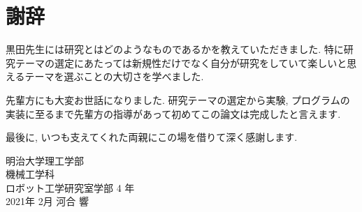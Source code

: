 \chapter*{謝辞}
黒田先生には研究とはどのようなものであるかを教えていただきました. 特に研究テーマの選定にあたっては新規性だけでなく自分が研究をしていて楽しいと思えるテーマを選ぶことの大切さを学べました. \par 先輩方にも大変お世話になりました. 研究テーマの選定から実験, プログラムの実装に至るまで先輩方の指導があって初めてこの論文は完成したと言えます. \par 最後に, いつも支えてくれた両親にこの場を借りて深く感謝します.

\begin{flushright}
    明治大学理工学部 \\
    機械工学科 \\
    ロボット工学研究室学部 4 年 \\
    2021年 2月 河合 響 \\
\end{flushright}
